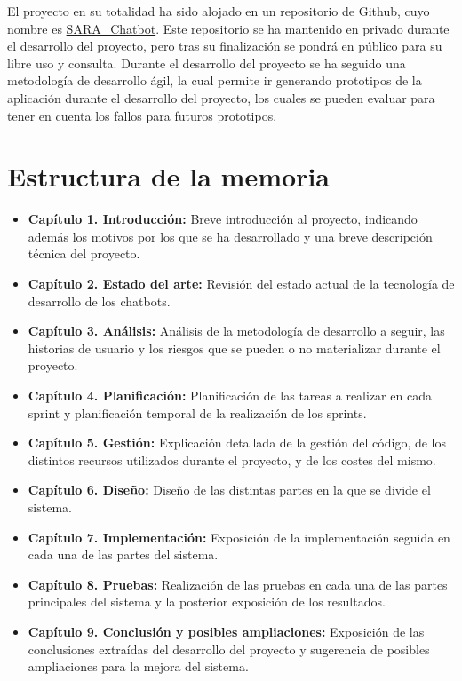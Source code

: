 El proyecto en su totalidad ha sido alojado en un repositorio de \gls{Github}, cuyo nombre es \href{https://github.com/Mario-Carmona/SARA_Chatbot}{SARA\_Chatbot}. Este repositorio se ha mantenido en privado durante el desarrollo del proyecto, pero tras su finalización se pondrá en público para su libre uso y consulta. Durante el desarrollo del proyecto se ha seguido una metodología de desarrollo ágil, la cual permite ir generando prototipos de la aplicación durante el desarrollo del proyecto, los cuales se pueden evaluar para tener en cuenta los fallos para futuros prototipos.

\section{Estructura de la memoria}

\begin{itemize}
\item \textbf{Capítulo 1. Introducción:} Breve introducción al proyecto, indicando además los motivos por los que se ha desarrollado y una breve descripción técnica del proyecto.
\item \textbf{Capítulo 2. Estado del arte:} Revisión del estado actual de la tecnología de desarrollo de los \glspl{chatbot}.
\item \textbf{Capítulo 3. Análisis:} Análisis de la metodología de desarrollo a seguir, las historias de usuario y los riesgos que se pueden o no materializar durante el proyecto.
\item \textbf{Capítulo 4. Planificación:} Planificación de las tareas a realizar en cada sprint y planificación temporal de la realización de los sprints.
\item \textbf{Capítulo 5. Gestión:} Explicación detallada de la gestión del código, de los distintos recursos utilizados durante el proyecto, y de los costes del mismo.
\item \textbf{Capítulo 6. Diseño:} Diseño de las distintas partes en la que se divide el sistema.
\item \textbf{Capítulo 7. Implementación:} Exposición de la implementación seguida en cada una de las partes del sistema.
\item \textbf{Capítulo 8. Pruebas:} Realización de las pruebas en cada una de las partes principales del sistema y la posterior exposición de los resultados.
\item \textbf{Capítulo 9. Conclusión y posibles ampliaciones:} Exposición de las conclusiones extraídas del desarrollo del proyecto y sugerencia de posibles ampliaciones para la mejora del sistema.
\end{itemize}

